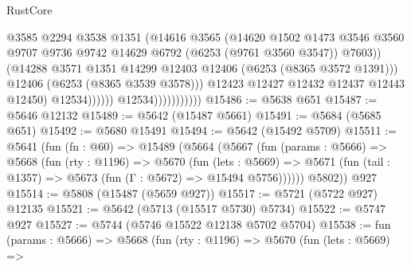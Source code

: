 \begin{lexlean}{RustCore}
\begin{coremodule}
                                          @3585
                                          @2294
                                          @3538
                                          @1351
                                          (@14616
                                            @3565
                                            (@14620
                                              @1502
                                              @1473
                                              @3546
                                              @3560
                                              @9707
                                              @9736
                                              @9742
                                              @14629
                                              @6792
                                              (@6253 (@9761 @3560 @3547))
                                              @7603))
                                          (@14288
                                            @3571
                                            @1351
                                            @14299
                                            @12403
                                            @12406
                                            (@6253 (@8365 @3572 @1391)))
                                          @12406
                                          (@6253 (@8365 @3539 @3578)))
                                        @12423
                                        @12427
                                        @12432
                                        @12437
                                        @12443
                                        @12450)
                                      @12534))))))
                          @12534)))))))))))
@15486 := @5638 @651
@15487 := @5646 @12132
@15489 := @5642 (@15487 @5661)
@15491 := @5684 (@5685 @651)
@15492 := @5680 @15491
@15494 := @5642 (@15492 @5709)
@15511 := @5641
    (fun (fn : @60) =>
    @15489
      (@5664
        (@5667
          (fun (params : @5666) =>
          @5668
            (fun (rty : @1196) =>
            @5670
              (fun (lets : @5669) =>
              @5671 (fun (tail : @1357) => @5673 (fun (Γ : @5672) => @15494 @5756))))))
        @5802))
    @927
@15514 := @5808 (@15487 (@5659 @927))
@15517 := @5721 (@5722 @927) @12135
@15521 := @5642 (@5713 (@15517 @5730) @5734)
@15522 := @5747 @927
@15527 := @5744 (@5746 @15522 @12138 @5702 @5704)
@15538 := fun (params : @5666) =>
  @5668
    (fun (rty : @1196) =>
    @5670
      (fun (lets : @5669) =>

\end{coremodule}
\end{lexlean}
